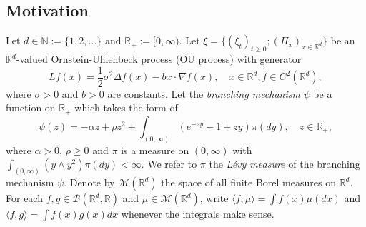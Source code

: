 \documentclass[12pt,a4paper]{amsart}
\theoremstyle{plain}
\theoremstyle{definition}
\numberwithin{equation}{section}
\begin{document}
\subsection{Motivation}
\label{sec: Motivation}
	Let $d \in \mathbb N:= \{1,2,\dots\}$ and $\mathbb R_+:= [0,\infty)$.
    Let $\xi=\{(\xi_t)_{t\geq 0}; (\Pi_x)_{x\in \mathbb R^d}\}$ be an $\mathbb R^d$-valued Ornstein-Uhlenbeck process (OU process) with generator
\begin{equation}
    Lf(x)
    = \frac{1}{2}\sigma^2\Delta f(x)-b x \cdot \nabla f(x),
    \quad  x\in \mathbb R^d, f \in C^2(\mathbb R^d),
\end{equation}
    where $\sigma > 0$ and $b > 0$ are constants.
        Let the \emph{branching mechanism} $\psi$ be a function on $\mathbb R_+$ which takes the form of
\begin{equation} \label{eq: honogeneou branching mechanism}
    \psi(z)=
    - \alpha z + \rho z^2 + \int_{(0,\infty)} (e^{-zy} - 1 + zy) \pi(dy),
    \quad  z \in \mathbb R_+,
\end{equation}
	where $\alpha > 0 $, $\rho \geq0$ and $\pi$ is a measure on $(0,\infty)$ with $\int_{(0,\infty)}(y\wedge y^2) \pi(dy)< \infty$.
	We refer to $\pi$ the \emph{L\'evy measure} of the branching mechanism $\psi$.
    Denote by $\mathcal M(\mathbb R^d)$ the space of all finite Borel measures on $\mathbb R^d$.
    For each $f,g\in \mathcal B(\mathbb R^d, \mathbb R)$ and $\mu \in \mathcal M(\mathbb R^d)$, write $\langle f,\mu\rangle = \int f(x)\mu(dx)$ and $\langle f, g\rangle = \int f(x)g(x) dx$ whenever the integrals make sense.
\end{document}
